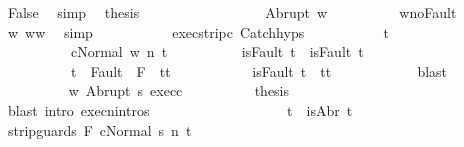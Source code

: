 \begin{isabellebody}
\ False\ \isamarkupfalse%
\ simp\ \isamarkupfalse%
\ {\isacharquery}thesis\ \isacommand{{\isachardot}{\isachardot}}\isamarkupfalse%
\isanewline
\ \ \ \ \ \ \isamarkupfalse%
\isanewline
\ \ \ \ \ \ \ \ \isamarkupfalse%
\ {\isacharparenleft}Abrupt\ w{\isacharprime}{\isacharprime}{\isacharparenright}\isanewline
\ \ \ \ \ \ \ \ \isamarkupfalse%
\ w{\isacharprime}{\isacharunderscore}noFault\ \isamarkupfalse%
\ w{\isacharprime}{\isacharprime}{\isacharcolon}\ {\isachardoublequoteopen}w{\isacharprime}{\isacharprime}{\isacharequal}w{\isachardoublequoteclose}\ \isamarkupfalse%
\ simp\isanewline
\ \ \ \ \ \ \ \ \isamarkupfalse%
\ \ exec{\isacharunderscore}strip{\isacharunderscore}c{}\ Catch{\isachardot}hyps\ \isanewline
\ \ \ \ \ \ \ \ \isamarkupfalse%
\ t{\isacharprime}\ \ \isanewline
\ \ \ \ \ \ \ \ \ \ {\isachardoublequoteopen}{\isasymGamma}{\isasymturnstile}{\isasymlangle}c{}{\isacharcomma}Normal\ w{\isasymrangle}\ {\isacharequal}n{\isasymRightarrow}\ t{\isacharprime}{\isachardoublequoteclose}\isanewline
\ \ \ \ \ \ \ \ \ \ {\isachardoublequoteopen}isFault\ t\ {\isasymlongrightarrow}\ isFault\ t{\isacharprime}{\isachardoublequoteclose}\isanewline
\ \ \ \ \ \ \ \ \ \ {\isachardoublequoteopen}t{\isacharprime}\ {\isasymin}\ Fault\ {\isacharbackquote}\ {\isacharparenleft}{\isacharminus}F{\isacharparenright}\ {\isasymlongrightarrow}\ t{\isacharprime}{\isacharequal}t{\isachardoublequoteclose}\isanewline
\ \ \ \ \ \ \ \ \ \ {\isachardoublequoteopen}{\isasymnot}\ isFault\ t{\isacharprime}\ {\isasymlongrightarrow}\ t{\isacharprime}{\isacharequal}t{\isachardoublequoteclose}\isanewline
\ \ \ \ \ \ \ \ \ \ \isamarkupfalse%
\ blast\isanewline
\ \ \ \ \ \ \ \ \isamarkupfalse%
\ w{\isacharprime}{\isacharprime}\ Abrupt\ s\ exec{\isacharunderscore}c{}\isanewline
\ \ \ \ \ \ \ \ \isamarkupfalse%
\ {\isacharquery}thesis\isanewline
\ \ \ \ \ \ \ \ \ \ \isamarkupfalse%
\ {\isacharparenleft}blast\ intro{\isacharcolon}\ execn{\isachardot}intros{\isacharparenright}\isanewline
\ \ \ \ \ \ \isamarkupfalse%
\isanewline
\ \ \ \ \isamarkupfalse%
\isanewline
\ \ \ \ \ \ \isamarkupfalse%
\ t{\isacharcolon}\ {\isachardoublequoteopen}{\isasymnot}\ isAbr\ t{\isachardoublequoteclose}\isanewline
\ \ \ \ \ \ \isamarkupfalse%
\ {\isachardoublequoteopen}{\isasymGamma}{\isasymturnstile}{\isasymlangle}strip{\isacharunderscore}guards\ F\ c{}{\isacharcomma}Normal\ s{\isacharprime}{\isasymrangle}\ {\isacharequal}n{\isasymRightarrow}\ t{\isachardoublequoteclose}\isanewline

\end{isabellebody}
